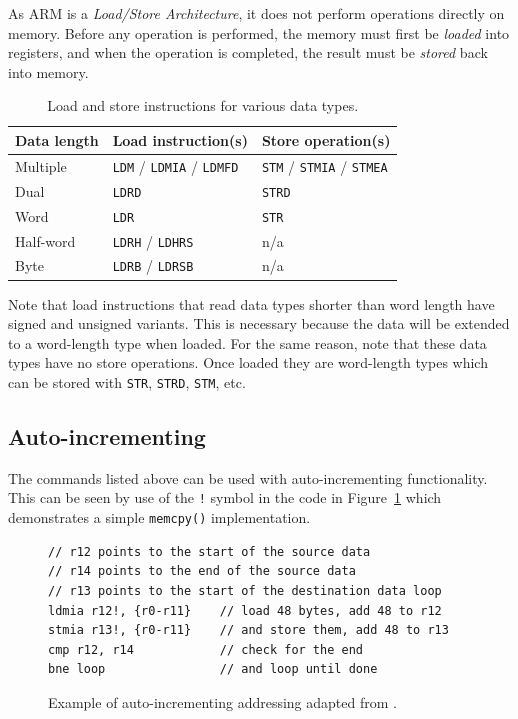 \documentclass[oneside,a4paper]{report}
\begin{document}
As ARM is a \emph{Load/Store Architecture}, it does not perform operations directly on memory. Before any operation is performed, the memory must first be \emph{loaded} into registers, and when the operation is completed, the result must be \emph{stored} back into memory. 

\begin{table}[htb]
	\begin{tabular}{lll}
		\toprule
		Data length	&	Load instruction(s)								&	Store operation(s)								\\
		\midrule
		Multiple	&	\texttt{LDM} / \texttt{LDMIA} / \texttt{LDMFD}	&	\texttt{STM} / \texttt{STMIA} / \texttt{STMEA}	\\
		Dual		&	\texttt{LDRD}									&	\texttt{STRD}									\\
		Word		&	\texttt{LDR}									&	\texttt{STR}									\\
		Half-word   &	\texttt{LDRH} / \texttt{LDHRS}					&	n/a												\\
		Byte        &	\texttt{LDRB} / \texttt{LDRSB}					&	n/a												\\
		\bottomrule		
	\end{tabular}
	\caption{Load and store instructions for various data types.}
	\label{tab:loadstore}
\end{table}

Note that load instructions that read data types shorter than word length have signed and unsigned variants. This is necessary because the data will be extended to a word-length type when loaded. For the same reason, note that these data types have no store operations. Once loaded they are word-length types which can be stored with \texttt{STR}, \texttt{STRD}, \texttt{STM}, etc.

\subsection{Auto-incrementing}
The commands listed above can be used with auto-incrementing functionality. This can be seen by use of the \texttt{!} symbol in the code in Figure~\ref{fig:autoincrement} which demonstrates a simple \texttt{memcpy()} implementation.

\begin{figure}[htb]
	\centering
	\begin{lstlisting}[language={[ARM]Assembler}]
// r12 points to the start of the source data
// r14 points to the end of the source data
// r13 points to the start of the destination data loop
ldmia r12!, {r0-r11}    // load 48 bytes, add 48 to r12
stmia r13!, {r0-r11}    // and store them, add 48 to r13
cmp r12, r14            // check for the end
bne loop                // and loop until done
	\end{lstlisting}
	\caption{Example of auto-incrementing addressing adapted from \cite[p. 61]{ARMInst}.}
	\label{fig:autoincrement}
\end{figure}
\end{document}
